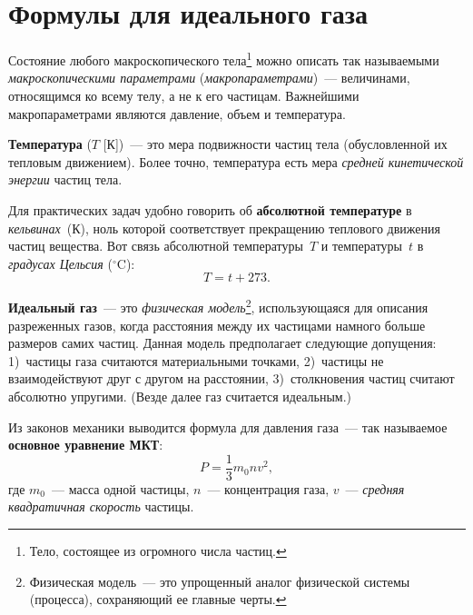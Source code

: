 \documentclass[main.tex]{subfiles}
\begin{document}

\pagestyle{empty}

 

\setcounter{section}{41
}
\addtocounter{section}{-1} 

\section{Формулы для идеального газа}


Состояние любого макроскопического тела\footnote{Тело, состоящее из огромного числа частиц.} можно описать так называемыми \emph{макроскопическими параметрами} (\emph{макропараметрами})~--- величинами, относящимся ко всему телу, а не к его частицам. Важнейшими макропараметрами являются давление, объем и температура.

\textbf{Температура} ($T$ [К])~--- это мера подвижности частиц тела (обусловленной их тепловым движением). Более точно, температура есть мера \emph{средней кинетической энергии} частиц тела.



Для практических задач удобно говорить об \textbf{абсолютной температуре} в \emph{кельвинах}~(К), ноль которой соответствует прекращению теплового движения частиц вещества. Вот связь абсолютной температуры~$T$ и температуры~$t$ в \emph{градусах Цельсия} ($^\circ\mathrm{C}$):
\begin{equation}
    T=t+273.
\end{equation}

\textbf{Идеальный газ}~--- это \emph{физическая модель}\footnote{Физическая модель~--- это упрощенный аналог физической системы (процесса), сохраняющий ее главные черты.}, использующаяся для описания разреженных газов, когда расстояния между их частицами намного больше размеров самих частиц. Данная модель предполагает следующие допущения: 1)~частицы газа считаются материальными точками, 2)~частицы не взаимодействуют друг с другом на расстоянии, 3)~столкновения частиц считают абсолютно упругими. (Везде далее газ считается идеальным.)

Из законов механики выводится формула для давления газа~--- так называемое \textbf{основное уравнение МКТ}:
\begin{equation}
    \label{e19}
    P=\frac{1}{3}m_0nv^2,
\end{equation}
где $m_0$~--- масса одной частицы, $n$~--- концентрация газа, $v$~--- \emph{средняя квадратичная скорость} частицы.
\end{document}
